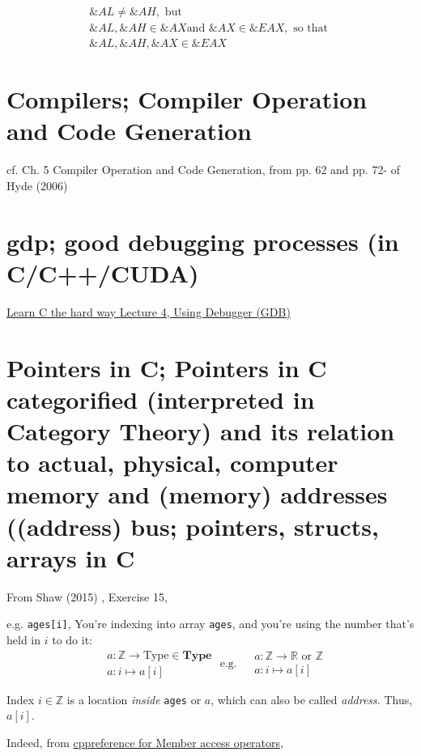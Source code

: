 \documentclass[10pt]{amsart}
\begin{document}
\[
\begin{gathered}
\&AL \neq \&AH, \text{ but } \\
\&AL, \&AH \in \&AX \text{and } \&AX \in \&EAX, \text{ so that } \\
\&AL , \&AH, \&AX \in \&EAX
\end{gathered}
\]

\section{Compilers; Compiler Operation and Code Generation}

cf. Ch. 5 Compiler Operation and Code Generation, from pp. 62 and pp. 72- of Hyde (2006) \cite{Hyde2006}





\section{gdp; good debugging processes (in C/C++/CUDA)}

\href{https://youtu.be/heEaKf2b1uA}{Learn C the hard way Lecture 4, Using Debugger (GDB) }


\section{Pointers in C; Pointers in C categorified (interpreted in Category Theory) and its relation to actual, physical, computer memory and (memory) addresses ((address) bus; pointers, structs, arrays in C}

From Shaw (2015) \cite{Shaw2015}, Exercise 15, 

e.g. \verb|ages[i]|, You're indexing into array \verb|ages|, and you're using the number that's held in $i$ to do it:  
\[
\begin{aligned}
& a : \mathbb{Z} \to \text{Type} \in \textbf{Type}  \\
& a: i \mapsto a[i]
\end{aligned} \text{ e.g. } 
\begin{aligned}
& a: \mathbb{Z} \to \mathbb{R} \text{ or } \mathbb{Z}  \\
& a:i \mapsto a[i]
\end{aligned}
\]

Index $i\in \mathbb{Z}$ is a location \emph{inside} \verb|ages| or $a$, which can also be called \emph{address}.  Thus, $a[i]$.  

Indeed, from \href{http://en.cppreference.com/w/cpp/language/operator_member_access}{cppreference for Member access operators}, 
\end{document}
